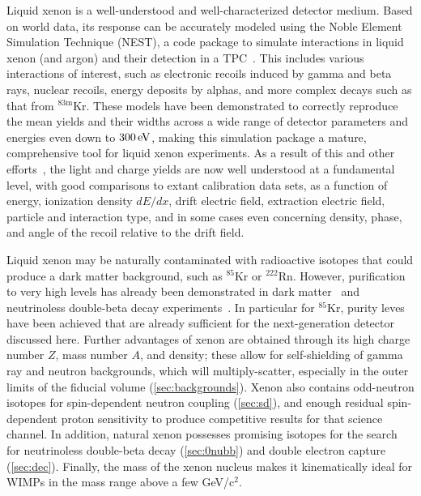 Liquid xenon is a well-understood and well-characterized detector medium. Based on world data, its response can be accurately modeled using the Noble Element Simulation Technique (NEST), a code package to simulate interactions in liquid xenon (and argon) and their detection in a TPC~\cite{Szydagis:2011tk, Szydagis:2013sih, Lenardo:2014cva, szydagis_m_2020_3905382}. This includes various interactions of interest, such as electronic recoils induced by gamma and beta rays, nuclear recoils, energy deposits by alphas, and more complex decays such as that from $^{83\text{m}}$Kr. These models have been demonstrated to correctly reproduce the mean yields and their widths across a wide range of detector parameters and energies even down to $300\, \mathrm{eV}$, making this simulation package a mature, comprehensive tool for liquid xenon experiments. As a result of this and other efforts~\cite{Sorensen:2008ec,Dahl:2009nta,Bezrukov:2010qa,Sorensen:2010hq,Mu:2013dga,Mu:2013pja,Wang:2016obw}, the light and charge yields are now well understood at a fundamental level, with good comparisons to extant calibration data sets, as a function of energy, ionization density $dE/dx$, drift electric field, extraction electric field, particle and interaction type, and in some cases even concerning density, phase, and angle of the recoil relative to the drift field. 

Liquid xenon may be naturally contaminated with radioactive isotopes that could produce a dark matter background, such as $^{85}$Kr or $^{222}$Rn. However, purification to very high levels has already been demonstrated in dark matter~\cite{Abe:2008py,Akerib:2016vxi,Aprile:2016swn,Aprile:2018dbl} and neutrinoless double-beta decay experiments~\cite{Albert:2014awa}. In particular for $^{85}$Kr, purity leves have been achieved that are already sufficient for the next-generation detector discussed here. Further advantages of xenon are obtained through its high charge number $Z$, mass number $A$, and density; these allow for self-shielding of gamma ray and neutron backgrounds, which will multiply-scatter, especially in the outer limits of the fiducial volume (\autoref{sec:backgrounds}). Xenon also contains odd-neutron isotopes for spin-dependent neutron coupling (\autoref{sec:sd}), and enough residual spin-dependent proton sensitivity to produce competitive results for that science channel. In addition, natural xenon possesses promising isotopes for the search for neutrinoless double-beta decay (\autoref{sec:0nubb}) and double electron capture (\autoref{sec:dec}). Finally, the mass of the xenon nucleus makes it kinematically ideal for WIMPs in the mass range above a few GeV/c$^2$.

